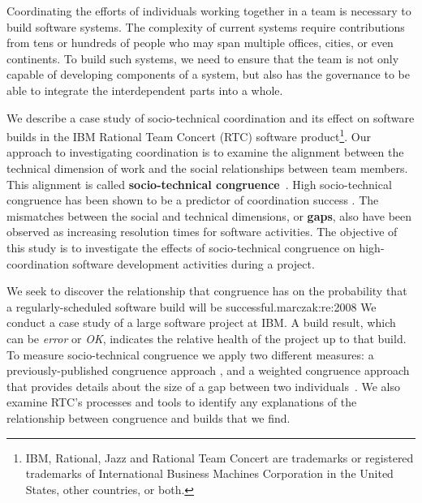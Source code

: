 \documentclass[12pt,oneside]{book}
\begin{document}




\label{chap:stc-net2}
Coordinating the efforts of individuals working together in a team is
necessary to build software systems. The complexity of current systems require contributions
from tens or hundreds of people who may span multiple offices, cities, or even continents.
To build such systems, we need to ensure that the team is not only capable of
developing components of a system, but also has the governance to be able to integrate the
interdependent parts into a whole.

We describe a case study of socio-technical coordination and its effect on software builds in the IBM\textsuperscript{\textregistered}
Rational Team Concert\textsuperscript{\textregistered} (RTC) software product\footnote{IBM, Rational, Jazz and Rational Team Concert are trademarks or registered trademarks of International Business Machines Corporation in the United States, other countries, or both.}.
Our approach to investigating coordination is to examine the
alignment between the technical dimension of work and the social relationships
between team members. This alignment is called \textbf{socio-technical
congruence}~\cite{cataldo:cscw:2006}. High socio-technical congruence
has been shown to be a predictor of coordination success
\cite{cataldo:cscw:2006,ehrlich2008:gaps}.
The mismatches between the social and technical dimensions, or \textbf{gaps},
also have been observed as increasing resolution times for software activities.
The objective of this study is to investigate the effects of socio-technical congruence on high-coordination software development activities during a project.

We seek to discover the relationship that congruence has on the probability that a regularly-scheduled software build will be successful.marczak:re:2008
We conduct a case study of a large software project at IBM.  A build result, which can be \emph{error} or \emph{OK}, indicates the relative health of the project up to that build. To
measure socio-technical congruence we apply two different measures: a
previously-published congruence approach \cite{cataldo:cscw:2006},
and a weighted congruence approach that provides details about the size of a
gap between two individuals~\cite{kwan2009:weighted}. We
also examine RTC's processes and tools to identify any
explanations of the relationship between congruence and builds that
we find.
\end{document}

